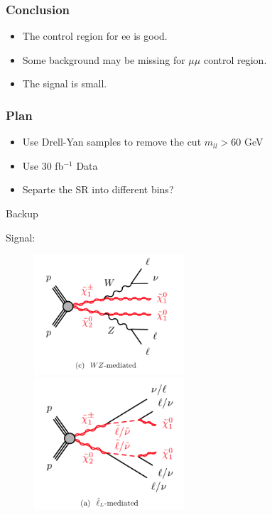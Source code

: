 \documentclass[mathserif,serif]{beamer}
\begin{document}

%

\def \PathToPlot {../plot}



%

\begin{frame}
\frametitle{Conclusion}
\begin{itemize}
\item The control region for ee is good.
\item Some background may be missing for $\mu\mu$ control region.
\item The signal is small.
\end{itemize}
\end{frame}

\begin{frame}
\frametitle{Plan}
\begin{itemize}
\item Use Drell-Yan samples to remove the cut $m_{ll} > 60$ GeV
\item Use 30 fb$^{-1}$ Data
\item Separte the SR into different bins?
\end{itemize}
\end{frame}

\begin{frame}
\begin{center}
\huge
Backup
\end{center}
\end{frame}

\begin{frame}
\small
Signal:\\
\begin{figure}
\includegraphics[width=0.5\textwidth]{data/WZ.png}
\includegraphics[width=0.5\textwidth]{data/slepton.png}
\end{figure}
\end{frame}
\end{document}
